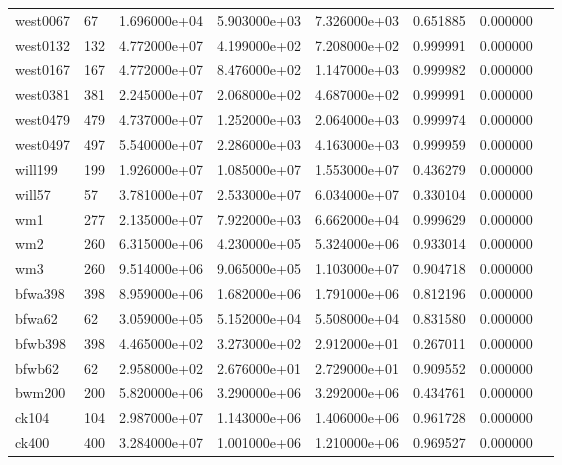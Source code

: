 \begin{tabular}{llrrrrrr}
west0067                &   67 &  1.696000e+04 &  5.903000e+03 &  7.326000e+03 &  0.651885 &  0.000000 \\
west0132                &  132 &  4.772000e+07 &  4.199000e+02 &  7.208000e+02 &  0.999991 &  0.000000 \\
west0167                &  167 &  4.772000e+07 &  8.476000e+02 &  1.147000e+03 &  0.999982 &  0.000000 \\
west0381                &  381 &  2.245000e+07 &  2.068000e+02 &  4.687000e+02 &  0.999991 &  0.000000 \\
west0479                &  479 &  4.737000e+07 &  1.252000e+03 &  2.064000e+03 &  0.999974 &  0.000000 \\
west0497                &  497 &  5.540000e+07 &  2.286000e+03 &  4.163000e+03 &  0.999959 &  0.000000 \\
will199                 &  199 &  1.926000e+07 &  1.085000e+07 &  1.553000e+07 &  0.436279 &  0.000000 \\
will57                  &   57 &  3.781000e+07 &  2.533000e+07 &  6.034000e+07 &  0.330104 &  0.000000 \\
wm1                     &  277 &  2.135000e+07 &  7.922000e+03 &  6.662000e+04 &  0.999629 &  0.000000 \\
wm2                     &  260 &  6.315000e+06 &  4.230000e+05 &  5.324000e+06 &  0.933014 &  0.000000 \\
wm3                     &  260 &  9.514000e+06 &  9.065000e+05 &  1.103000e+07 &  0.904718 &  0.000000 \\
bfwa398                 &  398 &  8.959000e+06 &  1.682000e+06 &  1.791000e+06 &  0.812196 &  0.000000 \\
bfwa62                  &   62 &  3.059000e+05 &  5.152000e+04 &  5.508000e+04 &  0.831580 &  0.000000 \\
bfwb398                 &  398 &  4.465000e+02 &  3.273000e+02 &  2.912000e+01 &  0.267011 &  0.000000 \\
bfwb62                  &   62 &  2.958000e+02 &  2.676000e+01 &  2.729000e+01 &  0.909552 &  0.000000 \\
bwm200                  &  200 &  5.820000e+06 &  3.290000e+06 &  3.292000e+06 &  0.434761 &  0.000000 \\
ck104                   &  104 &  2.987000e+07 &  1.143000e+06 &  1.406000e+06 &  0.961728 &  0.000000 \\
ck400                   &  400 &  3.284000e+07 &  1.001000e+06 &  1.210000e+06 &  0.969527 &  0.000000 \\

\end{tabular}
